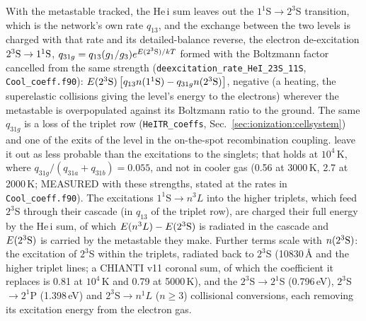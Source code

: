 With the metastable tracked, the He\,{\sc i} sum leaves out the
$1^1$S$\to2^3$S transition, which is the network's own rate $q_{13}$, and the
exchange between the two levels is charged with that rate and its
detailed-balance reverse, the electron de-excitation
$2^3{\rm S}\to1^1{\rm S}$,
$q_{31g} = q_{13}(g_1/g_3)e^{E(2^3{\rm S})/kT}$ formed with the Boltzmann
factor cancelled from the same \citet{Bray2000} strength
(\texttt{deexcitation\_rate\_HeI\_23S\_11S}, \texttt{Cool\_coeff.f90}):
$E(2^3{\rm S})\left[q_{13}n(1^1{\rm S})-q_{31g}n(2^3{\rm S})\right]$,
negative (a heating, the superelastic collisions giving the level's energy
to the electrons) wherever the metastable is overpopulated against its
Boltzmann ratio to the ground. The same $q_{31g}$ is a loss of the triplet
row (\texttt{HeITR\_coeffs}, Sec.~\ref{sec:ionization:cellsystem}) and one of
the exits of the level in the on-the-spot recombination coupling.
\citet{Oklopcic2018} leave it out as less probable than the excitations to
the singlets; that holds at $10^4$\,K, where
$q_{31g}/(q_{31a}+q_{31b}) = 0.055$, and not in cooler gas (0.56 at 3000\,K,
2.7 at 2000\,K; MEASURED with these strengths, stated at the rates in
\texttt{Cool\_coeff.f90}). The excitations $1^1$S$\to n^3L$ into the
higher triplets, which feed $2^3$S through their cascade (in $q_{13}$ of the
triplet row), are charged their full energy by the He\,{\sc i} sum, of
which $E(n^3L)-E(2^3{\rm S})$ is radiated in the cascade and $E(2^3{\rm S})$
is carried by the metastable they make. Further terms scale with
$n(2^3{\rm S})$: the excitation of $2^3$S within the triplets, radiated back
to $2^3$S (10830\,\AA{} and the higher triplet lines; a CHIANTI v11 coronal
sum, of which the \citet{Black1981} coefficient it replaces is 0.81 at
$10^4$\,K and 0.79 at 5000\,K), and the $2^3$S$\to2^1$S (0.796\,eV), $2^3$S$\to
2^1$P (1.398\,eV) and $2^3$S$\to n^1L$ ($n\ge3$) collisional conversions,
each removing its excitation energy from the electron gas.

